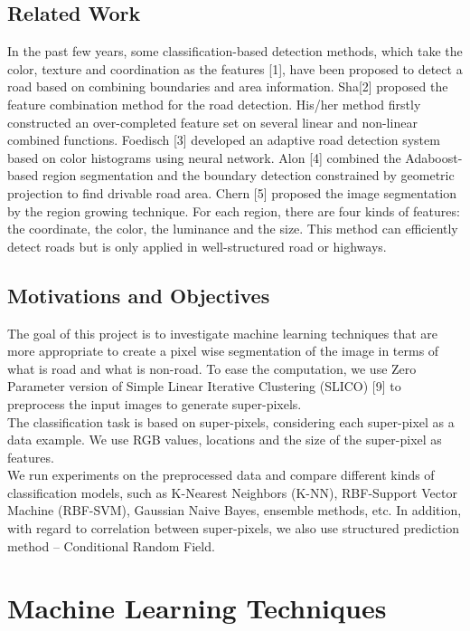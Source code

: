 \documentclass{article} %
\begin{document}
\subsection{Related Work}
In the past few years, some classification-based detection methods, which take the color, texture and coordination as the features [1], have been proposed to detect a road based on combining boundaries and area information. Sha[2] proposed the feature combination method for the road detection. His/her method firstly constructed an over-completed feature set on several linear and non-linear combined functions. Foedisch [3] developed an adaptive road detection system based on color histograms using neural network. Alon [4] combined the Adaboost-based region segmentation and the boundary detection constrained by geometric projection to find drivable road area. Chern [5] proposed the image segmentation by the region growing technique. For each region, there are four kinds of features: the coordinate, the color, the luminance and the size. This method can efficiently detect roads but is only applied in well-structured road or highways.

\subsection{Motivations and Objectives}
The goal of this project is to investigate machine learning techniques that are more appropriate to create a pixel wise segmentation of the image in terms of what is road and what is non-road. To ease the computation, we use Zero Parameter version of Simple Linear Iterative Clustering (SLICO) [9] to preprocess the input images to generate super-pixels. \\

The classification task is based on super-pixels, considering each super-pixel as a data example. We use RGB values, locations and the size of the super-pixel as features. \\

We run experiments on the preprocessed data and compare different kinds of classification models, such as K-Nearest Neighbors (K-NN), RBF-Support Vector Machine (RBF-SVM), Gaussian Naive Bayes, ensemble methods, etc. In addition, with regard to correlation between super-pixels, we also use structured prediction method -- Conditional Random Field.

\section{Machine Learning Techniques}
\label{gen_inst}
\end{document}
